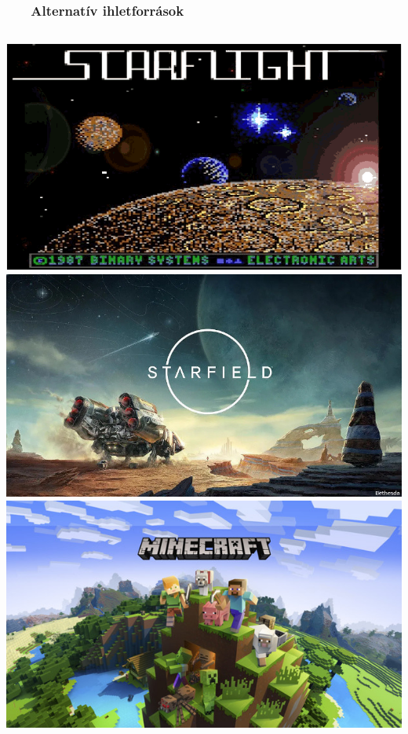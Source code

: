 \documentclass[
    aspectratio=169,
]{beamer}
\newcommand{\slidetitle}[2]{\frametitle{{\small #1 ~ \ding{226} ~ } \normalsize \textbf{#2} }}
\begin{document}
\begin{frame}[noframenumbering]
    \slidetitle{\sectionshorttitle}{Alternatív ihletforrások}
    
    \begin{columns}[t]
    \includegraphics[width=\linewidth, frame]{image/starflight}
    \includegraphics[width=\linewidth, frame]{image/starfield}
    \includegraphics[width=\linewidth, frame]{image/minecraft}

\end{columns}
\end{frame}
\end{document}
